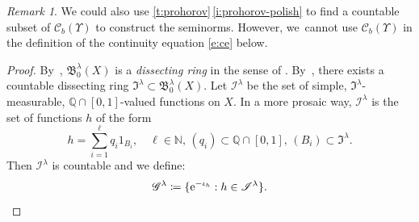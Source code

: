 \documentclass[10pt]{amsart}
\theoremstyle{definition}
\theoremstyle{remark}
\newtheorem{remark}[theorem]{Remark}
\DeclarePairedDelimiter{\set}{\lbrace}{\rbrace}
\begin{document}
\begin{remark}
We could also use \cref{t:prohorov}\,\cref{i:prohorov-polish} to find a countable subset of $\mathscr{C}_{b}(\varUpsilon)$ to construct the seminorms.
However, we~cannot use $\mathscr{C}_{b}(\varUpsilon)$ in the definition of the continuity equation \cref{e:ce} below.
\end{remark}

\begin{proof}
By~\cite[Lem.\,1.9(v)]{Kallenberg}, $\mathfrak{B}_{0}^{\lambda}(X)$ is a \emph{dissecting ring} in the sense of \cite[p.\,24]{Kallenberg}.
By~\cite[Lem.\,1.9(i)]{Kallenberg}, there exists a countable dissecting ring $\mathfrak{I}^{\lambda} \subset \mathfrak{B}_{0}^{\lambda}(X)$.
Let $\mathscr{I}^{\lambda}$ be the set of simple, $\mathfrak{I}^{\lambda}$-measurable, $\mathbb{Q} \cap [0,1]$-valued functions on $X$.
In a more prosaic way, $\mathscr{I}^{\lambda}$ is the set of functions $h$ of the form
\begin{equation*}
h = \sum_{i=1}^{\ell} q_{i} 1_{B_{i}}, \quad \ell \in \mathbb{N},\, (q_{i}) \subset \mathbb{Q} \cap [0,1],\, (B_{i}) \subset \mathfrak{I}^{\lambda}.
\end{equation*}
Then $\mathscr{I}^{\lambda}$ is countable and we define:
\begin{equation*}
\mathscr{G}^{\lambda} \coloneq \set{ \mathrm{e}^{-\iota_{h}} : h \in \mathscr{I}^{\lambda} }.
\end{equation*}


\end{proof}
\end{document}
